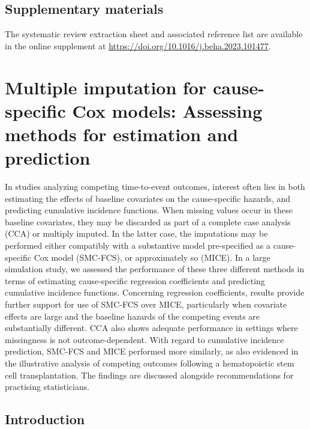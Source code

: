 \documentclass[
  letterpaper,
  DIV=11,
  numbers=noendperiod]{scrreprt}
\begin{document}
\section*{Supplementary materials}\label{supplementary-materials}


The systematic review extraction sheet and associated reference list are
available in the online supplement at
\url{https://doi.org/10.1016/j.beha.2023.101477}.


\chapter{Multiple imputation for cause-specific Cox models: Assessing
methods for estimation and prediction}\label{sec-chap-CS-MI}

In studies analyzing competing time-to-event outcomes, interest often
lies in both estimating the effects of baseline covariates on the
cause-specific hazards, and predicting cumulative incidence functions.
When missing values occur in these baseline covariates, they may be
discarded as part of a complete case analysis (CCA) or multiply imputed.
In the latter case, the imputations may be performed either compatibly
with a substantive model pre-specified as a cause-specific Cox model
(SMC-FCS), or approximately so (MICE). In a large simulation study, we
assessed the performance of these three different methods in terms of
estimating cause-specific regression coefficients and predicting
cumulative incidence functions. Concerning regression coefficients,
results provide further support for use of SMC-FCS over MICE,
particularly when covariate effects are large and the baseline hazards
of the competing events are substantially different. CCA also shows
adequate performance in settings where missingness is not
outcome-dependent. With regard to cumulative incidence prediction,
SMC-FCS and MICE performed more similarly, as also evidenced in the
illustrative analysis of competing outcomes following a hematopoietic
stem cell transplantation. The findings are discussed alongside
recommendations for practising statisticians.

\hfill\break

\section{Introduction}\label{introduction-1}
\end{document}
